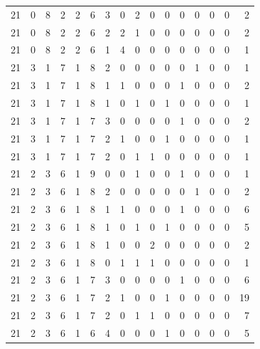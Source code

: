 \begin{appendix}
{\begin{longtable}{lrrrrrrrrrrrrrrr}
    21        & 0  & 8  & 2  & 2  & 6  & 3  & 0  & 2  & 0  & 0  & 0  & 0   & 0   & 0   & 2    \\
    21        & 0  & 8  & 2  & 2  & 6  & 2  & 2  & 1  & 0  & 0  & 0  & 0   & 0   & 0   & 2    \\
    21        & 0  & 8  & 2  & 2  & 6  & 1  & 4  & 0  & 0  & 0  & 0  & 0   & 0   & 0   & 1    \\
    21        & 3  & 1  & 7  & 1  & 8  & 2  & 0  & 0  & 0  & 0  & 0  & 1   & 0   & 0   & 1    \\
    21        & 3  & 1  & 7  & 1  & 8  & 1  & 1  & 0  & 0  & 0  & 1  & 0   & 0   & 0   & 2    \\
    21        & 3  & 1  & 7  & 1  & 8  & 1  & 0  & 1  & 0  & 1  & 0  & 0   & 0   & 0   & 1    \\
    21        & 3  & 1  & 7  & 1  & 7  & 3  & 0  & 0  & 0  & 0  & 1  & 0   & 0   & 0   & 2    \\
    21        & 3  & 1  & 7  & 1  & 7  & 2  & 1  & 0  & 0  & 1  & 0  & 0   & 0   & 0   & 1    \\
    21        & 3  & 1  & 7  & 1  & 7  & 2  & 0  & 1  & 1  & 0  & 0  & 0   & 0   & 0   & 1    \\
    21        & 2  & 3  & 6  & 1  & 9  & 0  & 0  & 1  & 0  & 0  & 1  & 0   & 0   & 0   & 1    \\
    21        & 2  & 3  & 6  & 1  & 8  & 2  & 0  & 0  & 0  & 0  & 0  & 1   & 0   & 0   & 2    \\
    21        & 2  & 3  & 6  & 1  & 8  & 1  & 1  & 0  & 0  & 0  & 1  & 0   & 0   & 0   & 6    \\
    21        & 2  & 3  & 6  & 1  & 8  & 1  & 0  & 1  & 0  & 1  & 0  & 0   & 0   & 0   & 5    \\
    21        & 2  & 3  & 6  & 1  & 8  & 1  & 0  & 0  & 2  & 0  & 0  & 0   & 0   & 0   & 2    \\
    21        & 2  & 3  & 6  & 1  & 8  & 0  & 1  & 1  & 1  & 0  & 0  & 0   & 0   & 0   & 1    \\
    21        & 2  & 3  & 6  & 1  & 7  & 3  & 0  & 0  & 0  & 0  & 1  & 0   & 0   & 0   & 6    \\
    21        & 2  & 3  & 6  & 1  & 7  & 2  & 1  & 0  & 0  & 1  & 0  & 0   & 0   & 0   & 19   \\
    21        & 2  & 3  & 6  & 1  & 7  & 2  & 0  & 1  & 1  & 0  & 0  & 0   & 0   & 0   & 7    \\
    21        & 2  & 3  & 6  & 1  & 6  & 4  & 0  & 0  & 0  & 1  & 0  & 0   & 0   & 0   & 5    \\

\end{longtable}}
\end{appendix}
